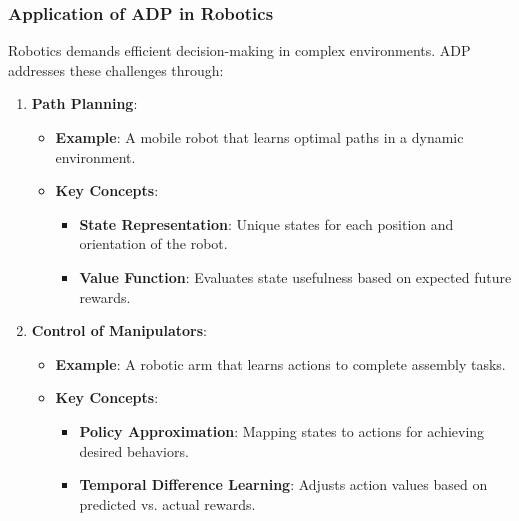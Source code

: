 \documentclass[aspectratio=169]{beamer}
\begin{document}
\begin{frame}[fragile]
    \frametitle{Application of ADP in Robotics}
    Robotics demands efficient decision-making in complex environments. ADP addresses these challenges through:
    
    \begin{enumerate}
        \item \textbf{Path Planning}:
            \begin{itemize}
                \item \textbf{Example}: A mobile robot that learns optimal paths in a dynamic environment.
                \item \textbf{Key Concepts}:
                    \begin{itemize}
                        \item \textbf{State Representation}: Unique states for each position and orientation of the robot.
                        \item \textbf{Value Function}: Evaluates state usefulness based on expected future rewards.
                    \end{itemize}
            \end{itemize}

        \item \textbf{Control of Manipulators}:
            \begin{itemize}
                \item \textbf{Example}: A robotic arm that learns actions to complete assembly tasks.
                \item \textbf{Key Concepts}:
                    \begin{itemize}
                        \item \textbf{Policy Approximation}: Mapping states to actions for achieving desired behaviors.
                        \item \textbf{Temporal Difference Learning}: Adjusts action values based on predicted vs. actual rewards.
                    \end{itemize}
            \end{itemize}
    \end{enumerate}
\end{frame}
\end{document}
